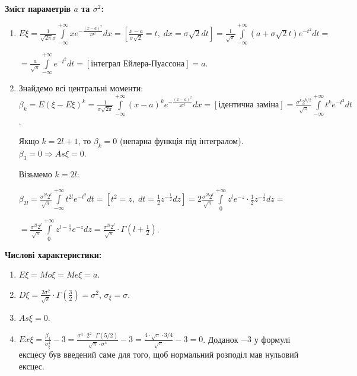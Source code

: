\noindent \textbf{Зміст параметрів $a$ та $\sigma^2$:}
\begin{enumerate}
    \item $E\xi = 
    \frac{1}{\sqrt{2\pi}\sigma}
    \int\limits_{-\infty}^{+\infty}x e^{-\frac{(x-a)^2}{2\sigma^2}} dx 
    = \left[ \frac{x-a}{\sigma \sqrt{2}} = t, \; dx = \sigma\sqrt{2}dt \right] = 
    \frac{1}{\sqrt{\pi}}\int\limits_{-\infty}^{+\infty} 
    (a + \sigma\sqrt{2}t)e^{-t^2} dt =$
    
    $=\frac{a}{\sqrt{\pi}}
    \int\limits_{-\infty}^{+\infty}e^{-t^2}dt =
    \left[\text{інтеграл Ейлера-Пуассона}\right] = a$.
    \item Знайдемо всі центральні моменти:
    $\beta_k = E(\xi - E\xi)^k = 
    \frac{1}{\sigma\sqrt{2\pi}}
    \int\limits_{-\infty}^{+\infty}(x-a)^k 
    e^{-\frac{(x-a)^2}{2\sigma^2}} dx = \left[
        \text{ідентична заміна}
    \right] =
    \frac{\sigma^k 2^{k/2}}{\sqrt{\pi}}
    \int\limits_{-\infty}^{+\infty}t^k 
    e^{-t^2} dt
    $.

    Якщо $k = 2l + 1$, то $\beta_k = 0$ (непарна функція під інтегралом).
    $\beta_3 = 0 \Rightarrow As\xi = 0$.

    Візьмемо $k = 2l$:

    $\beta_{2l} = 
    \frac{\sigma^{2l} 2^{l}}{\sqrt{\pi}}
    \int\limits_{-\infty}^{+\infty}t^{2l} 
    e^{-t^2} dt = 
    \left[ t^2 = z, \; dt = \frac{1}{2} z^{-\frac{1}{2}}dz\right] =
    2\frac{\sigma^{2l}2^l}{\sqrt{\pi}}
    \int\limits_{0}^{+\infty}z^l e^{-z}\cdot \frac{1}{2} z^{-\frac{1}{2}}
    dz = $
    
    $= \frac{\sigma^{2l}2^l}{\sqrt{\pi}}
    \int\limits_{0}^{+\infty}z^{l-\frac{1}{2}} e^{-z}
    dz = 
    \frac{\sigma^{2l}2^l}{\sqrt{\pi}}\cdot\Gamma(l+\frac{1}{2})$.
\end{enumerate}

\noindent \textbf{Числові характеристики:}
\begin{enumerate}
    \item $E\xi = Mo\xi = Me\xi = a$.
    \item $D\xi = \frac{2 \sigma^2}{\sqrt{\pi}}\cdot\Gamma\left(\frac{3}{2}\right) 
    = \sigma^2$, $\sigma_\xi = \sigma$.
    \item $As\xi = 0$.
    \item $Ex\xi = \frac{\beta_4}{\sigma_\xi^4} - 3 = 
    \frac{\sigma^4\cdot2^2\cdot\Gamma(5/2)}{\sqrt{\pi}\cdot\sigma^4} - 3 = \frac{4\cdot\sqrt{\pi}\cdot 3/4}{\sqrt{\pi}} - 3 = 0$. 
    Доданок $-3$ у формулі ексцесу був введений саме для того, щоб нормальний розподіл мав нульовий ексцес.
\end{enumerate}

